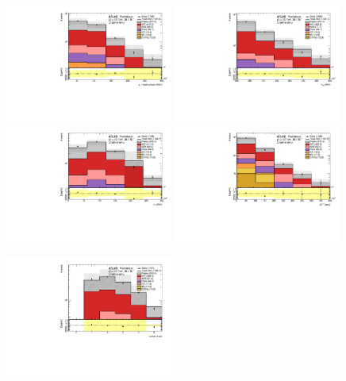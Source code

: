 \begin{figure}[htbp]
\includegraphics[width=0.49\textwidth]{data/plot/DataFakes/FakeEff/IntNote_pTlead_emu.pdf}
\includegraphics[width=0.49\textwidth]{data/plot/DataFakes/FakeEff/IntNote_meff_emu.pdf}\\
\includegraphics[width=0.49\textwidth]{data/plot/DataFakes/FakeEff/IntNote_mT_emu.pdf}
\includegraphics[width=0.49\textwidth]{data/plot/DataFakes/FakeEff/IntNote_met_emu.pdf}\\
\begin{center}
\includegraphics[width=0.49\textwidth]{data/plot/DataFakes/FakeEff/IntNote_nJets_emu.pdf}

\end{center}
\end{figure}
